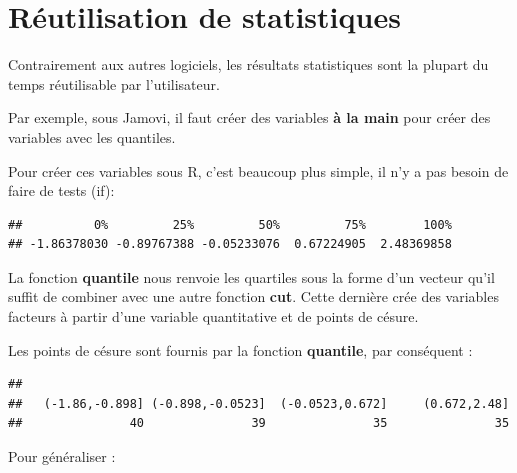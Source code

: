 \documentclass[
]{book}
\newenvironment{Shaded}{\begin{snugshade}}{\end{snugshade}}
\newcommand{\AttributeTok}[1]{\textcolor[rgb]{0.13,0.29,0.53}{#1}}
\newcommand{\FunctionTok}[1]{\textcolor[rgb]{0.13,0.29,0.53}{\textbf{#1}}}
\newcommand{\NormalTok}[1]{#1}
\newcommand{\SpecialCharTok}[1]{\textcolor[rgb]{0.81,0.36,0.00}{\textbf{#1}}}
\begin{document}
\section{Réutilisation de statistiques}\label{ruxe9utilisation-de-statistiques}

Contrairement aux autres logiciels, les résultats statistiques sont la plupart
du temps réutilisable par l'utilisateur.

Par exemple, sous Jamovi, il faut créer des variables \textbf{à la main} pour créer
des variables avec les quantiles.

Pour créer ces variables sous R, c'est beaucoup plus simple, il n'y a pas besoin
de faire de tests (if):

\begin{Shaded}
\end{Shaded}

\begin{verbatim}
##          0%         25%         50%         75%        100% 
## -1.86378030 -0.89767388 -0.05233076  0.67224905  2.48369858
\end{verbatim}

La fonction \textbf{quantile} nous renvoie les quartiles sous la forme d'un vecteur qu'il
suffit de combiner avec une autre fonction \textbf{cut}. Cette dernière crée des
variables facteurs à partir d'une variable quantitative et de points de césure.

Les points de césure sont fournis par la fonction \textbf{quantile}, par conséquent :

\begin{Shaded}
\end{Shaded}

\begin{verbatim}
## 
##   (-1.86,-0.898] (-0.898,-0.0523]  (-0.0523,0.672]     (0.672,2.48] 
##               40               39               35               35
\end{verbatim}

Pour généraliser :
\end{document}
